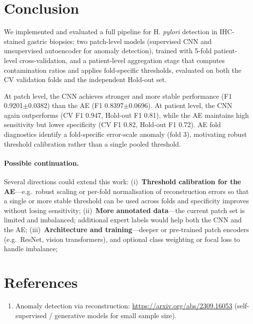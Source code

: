 \documentclass[11pt,a4paper]{article}
\begin{document}
\section{Conclusion}
\label{sec:conclusion}
We implemented and evaluated a full pipeline for H.\textit{ pylori} detection in IHC-stained gastric biopsies: two patch-level models (supervised CNN and unsupervised autoencoder for anomaly detection), trained with 5-fold patient-level cross-validation, and a patient-level aggregation stage that computes contamination ratios and applies fold-specific thresholds, evaluated on both the CV validation folds and the independent Hold-out set.

At patch level, the CNN achieves stronger and more stable performance (F1 0.9201$\pm$0.0382) than the AE (F1 0.8397$\pm$0.0696). At patient level, the CNN again outperforms (CV F1 0.947, Hold-out F1 0.81), while the AE maintains high sensitivity but lower specificity (CV F1 0.82, Hold-out F1 0.72). AE fold diagnostics identify a fold-specific error-scale anomaly (fold 3), motivating robust threshold calibration rather than a single pooled threshold.

\paragraph{Possible continuation.}
Several directions could extend this work:
(i)~\textbf{Threshold calibration for the AE}---e.g.\ robust scaling or per-fold normalisation of reconstruction errors so that a single or more stable threshold can be used across folds and specificity improves without losing sensitivity;
(ii)~\textbf{More annotated data}---the current patch set is limited and imbalanced; additional expert labels would help both the CNN and the AE;
(iii)~\textbf{Architecture and training}---deeper or pre-trained patch encoders (e.g.\ ResNet, vision transformers), and optional class weighting or focal loss to handle imbalance;


\newpage

\section*{References}
\begin{enumerate}
  \item Anomaly detection via reconstruction: \url{https://arxiv.org/abs/2309.16053} (self-supervised / generative models for small sample size).
\end{enumerate}
\end{document}
